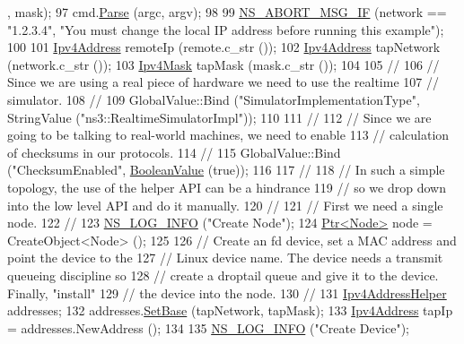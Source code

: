 \begin{DoxyCode}
      , mask);
97   cmd.\hyperlink{classns3_1_1CommandLine_a5c10b85b3207e5ecb48d907966923156}{Parse} (argc, argv);
98 
99   \hyperlink{group__fatal_ga6653324225bc139e46deea177614ceee}{NS\_ABORT\_MSG\_IF} (network == \textcolor{stringliteral}{"1.2.3.4"}, \textcolor{stringliteral}{"You must change the local IP address before
       running this example"});
100 
101   \hyperlink{classns3_1_1Ipv4Address}{Ipv4Address} remoteIp (remote.c\_str ());
102   \hyperlink{classns3_1_1Ipv4Address}{Ipv4Address} tapNetwork (network.c\_str ());
103   \hyperlink{classns3_1_1Ipv4Mask}{Ipv4Mask} tapMask (mask.c\_str ());
104 
105   \textcolor{comment}{//}
106   \textcolor{comment}{// Since we are using a real piece of hardware we need to use the realtime}
107   \textcolor{comment}{// simulator.}
108   \textcolor{comment}{//}
109   GlobalValue::Bind (\textcolor{stringliteral}{"SimulatorImplementationType"}, StringValue (\textcolor{stringliteral}{"ns3::RealtimeSimulatorImpl"}));
110 
111   \textcolor{comment}{//}
112   \textcolor{comment}{// Since we are going to be talking to real-world machines, we need to enable}
113   \textcolor{comment}{// calculation of checksums in our protocols.}
114   \textcolor{comment}{//}
115   GlobalValue::Bind (\textcolor{stringliteral}{"ChecksumEnabled"}, \hyperlink{classns3_1_1BooleanValue}{BooleanValue} (\textcolor{keyword}{true}));
116 
117   \textcolor{comment}{//}
118   \textcolor{comment}{// In such a simple topology, the use of the helper API can be a hindrance}
119   \textcolor{comment}{// so we drop down into the low level API and do it manually.}
120   \textcolor{comment}{//}
121   \textcolor{comment}{// First we need a single node.}
122   \textcolor{comment}{//}
123   \hyperlink{group__logging_gafbd73ee2cf9f26b319f49086d8e860fb}{NS\_LOG\_INFO} (\textcolor{stringliteral}{"Create Node"});
124   \hyperlink{classns3_1_1Ptr}{Ptr<Node>} node = CreateObject<Node> ();
125 
126   \textcolor{comment}{// Create an fd device, set a MAC address and point the device to the}
127   \textcolor{comment}{// Linux device name.  The device needs a transmit queueing discipline so}
128   \textcolor{comment}{// create a droptail queue and give it to the device.  Finally, "install"}
129   \textcolor{comment}{// the device into the node.}
130   \textcolor{comment}{//}
131   \hyperlink{classns3_1_1Ipv4AddressHelper}{Ipv4AddressHelper} addresses;
132   addresses.\hyperlink{classns3_1_1Ipv4AddressHelper_acf7b16dd25bac67e00f5e25f90a9a035}{SetBase} (tapNetwork, tapMask);
133   \hyperlink{classns3_1_1Ipv4Address}{Ipv4Address} tapIp = addresses.NewAddress ();
134 
135   \hyperlink{group__logging_gafbd73ee2cf9f26b319f49086d8e860fb}{NS\_LOG\_INFO} (\textcolor{stringliteral}{"Create Device"});

\end{DoxyCode}
